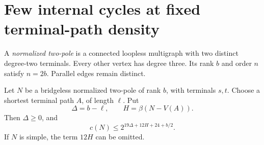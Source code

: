 \section{Few internal cycles at fixed terminal-path density}
\label{sec:high-path-cycle-tradeoff}

A \emph{normalized two-pole} is a connected loopless multigraph with two distinct degree-two terminals.
Every other vertex has degree three.
Its rank $b$ and order $n$ satisfy $n=2b$.
Parallel edges remain distinct.

\begin{lemma}
\label{lem:thin-layer-cycle-count}
Let $N$ be a bridgeless normalized two-pole of rank $b$, with terminals $s,t$.
Choose a shortest terminal path $A$, of length $\ell$.
Put
\[
 \Delta=b-\ell,\qquad H=\beta(N-V(A)).
\]
Then $\Delta\ge0$, and
\[
 c(N)\le 2^{19\Delta+12H+24+b/2}.
\]
If $N$ is simple, the term $12H$ can be omitted.
\end{lemma}

